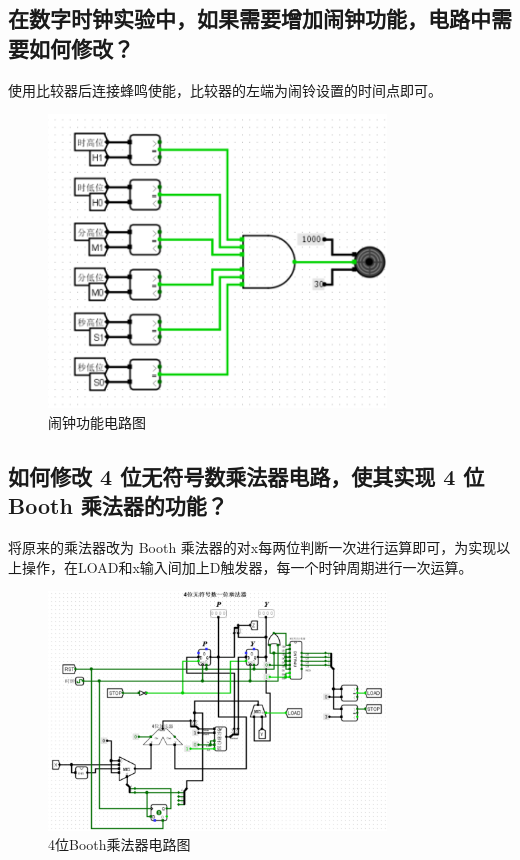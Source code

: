 \documentclass{article}
\begin{document}
    \subsection{在数字时钟实验中，如果需要增加闹钟功能，电路中需要如何修改？}
    使用比较器后连接蜂鸣使能，比较器的左端为闹铃设置的时间点即可。
    \begin{figure}[H]
        \centering
        \includegraphics[width=0.8\textwidth]{6.1.png}
        \caption{闹钟功能电路图}
    \end{figure}

    \subsection{如何修改 4 位无符号数乘法器电路，使其实现 4 位 Booth 乘法器的功能？}
    将原来的乘法器改为 Booth 乘法器的对x每两位判断一次进行运算即可，为实现以上操作，在LOAD和x输入间加上D触发器，每一个时钟周期进行一次运算。
    \begin{figure}[H]
        \centering
        \includegraphics[width=0.8\textwidth]{7.1.png}
        \caption{4位Booth乘法器电路图}
    \end{figure}
\end{document}
